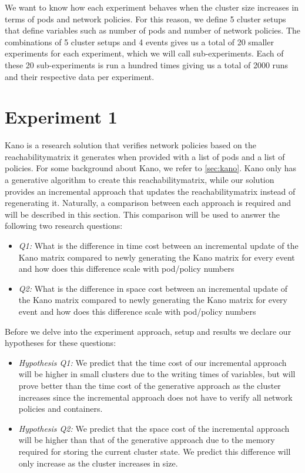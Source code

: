 We want to know how each experiment behaves when the cluster size increases in terms of pods and network policies. For this reason, we define 5 cluster setups that define variables such as number of pods and number of network policies. The combinations of 5 cluster setups and 4 events gives us a total of 20 smaller experiments for each experiment,  which we will call sub-experiments.  Each of these 20 sub-experiments is run a hundred times giving us a total of 2000 runs and their respective data per experiment.
\\[10pt]


\section{Experiment 1}\label{sec:experiment1}
Kano is a research solution that verifies network policies based on the reachabilitymatrix it generates when provided with a list of pods and a list of policies. For some background about Kano, we refer to \autoref{sec:kano}. Kano only has a generative algorithm to create this reachabilitymatrix, while our solution provides an incremental approach that updates the reachabilitymatrix instead of regenerating it. Naturally, a comparison between each approach is required and will be described in this section. This comparison will be used to answer the following two research questions:

\begin{itemize}
    \item \textit{Q1:} What is the difference in time cost between an incremental update of the Kano matrix compared to newly generating the Kano matrix for every event and how does this difference scale with pod/policy numbers
    \item \textit{Q2:} What is the difference in space cost between an incremental update of the Kano matrix compared to newly generating the Kano matrix for every event and how does this difference scale with pod/policy numbers
\end{itemize}

Before we delve into the experiment approach, setup and results we declare our hypotheses for these questions:

\begin{itemize}
    \item \textit{Hypothesis Q1:} We predict that the time cost of our incremental approach will be higher in small clusters due to the writing times of variables, but will prove better than the time cost of the generative approach as the cluster increases since the incremental approach does not have to verify all network policies and containers.
    \item \textit{Hypothesis Q2:} We predict that the space cost of the incremental approach will be higher than that of the generative approach due to the memory required for storing the current cluster state. We predict this difference will only increase as the cluster increases in size.
\end{itemize}

